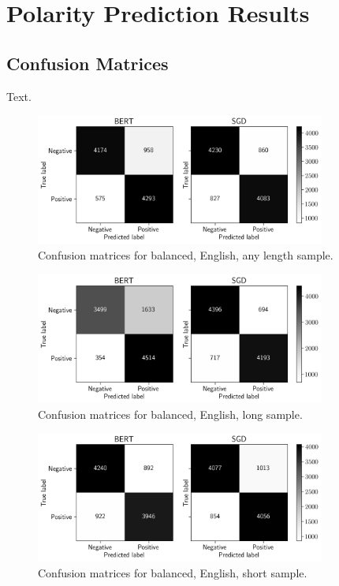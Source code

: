 \chapter{Polarity Prediction Results} \label{sec:A1}

\section{Confusion Matrices} \label{sec:A1_CM}

Text.

\begin{figure}[!htb]
    \centering
    \includegraphics[width=0.85\textwidth]{figures/06_results/01_rfp/01_pol/01_cm/eng_eq_any.png}
    \caption{Confusion matrices for balanced, English, any length sample.}
    \label{fig:A1_CM_BEA}
\end{figure}

\begin{figure}[!htb]
    \centering
    \includegraphics[width=0.85\textwidth]{figures/06_results/01_rfp/01_pol/01_cm/eng_eq_long.png}
    \caption{Confusion matrices for balanced, English, long sample.}
    \label{fig:A1_CM_BEL}
\end{figure}

\begin{figure}[!htb]
    \centering
    \includegraphics[width=0.85\textwidth]{figures/06_results/01_rfp/01_pol/01_cm/eng_eq_short.png}
    \caption{Confusion matrices for balanced, English, short sample.}
    \label{fig:A1_CM_BES}
\end{figure}

